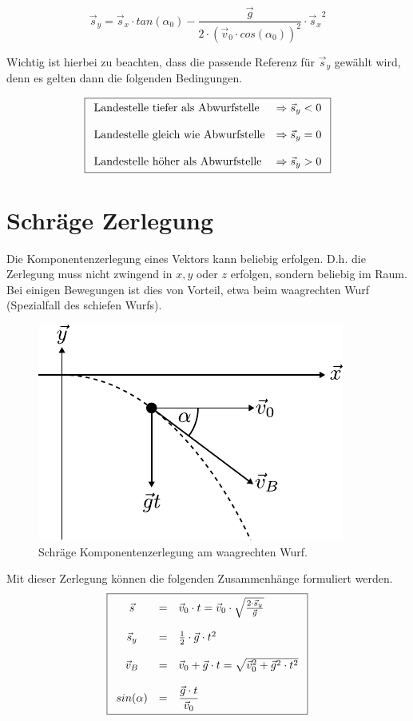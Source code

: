 \[ \boxed{
	\vec{s}_y = \vec{s}_x \cdot tan(\alpha_0) 
		- \frac{\vec{g}}{2 \cdot \left(
		\vec{v}_0 \cdot cos(\alpha_0) \right)^2}
		\cdot {\vec{s}_x}^2
} \]

\noindent
Wichtig ist hierbei zu beachten, dass die passende Referenz für 
$\vec{s}_y$ gewählt wird, denn es gelten dann die folgenden Bedingungen.

\[ \boxed{\begin{array}{l l}
	\text{Landestelle tiefer als Abwurfstelle} 
		& \Rightarrow \vec{s}_y < 0 \\
	& \\
	\text{Landestelle gleich wie Abwurfstelle} 
		& \Rightarrow \vec{s}_y = 0 \\
	& \\
	\text{Landestelle höher als Abwurfstelle} 
		& \Rightarrow \vec{s}_y > 0 
\end{array}} \]


\section{Schräge Zerlegung}
Die Komponentenzerlegung eines Vektors kann beliebig erfolgen. 
D.h. die Zerlegung muss nicht zwingend in $x,y$ oder $z$ erfolgen,
sondern beliebig im Raum. Bei einigen Bewegungen ist dies von Vorteil,
etwa beim waagrechten Wurf (Spezialfall des schiefen Wurfs).

\begin{figure}[h!]
	\centering
	\includegraphics[scale=0.8]{../fig/wurf2.pdf}
	\caption{Schräge Komponentenzerlegung am waagrechten Wurf.}
	\label{fig:wurf2}
\end{figure}

\noindent
Mit dieser Zerlegung können die folgenden Zusammenhänge formuliert werden.
\[ \boxed{\begin{array}{c c l}
	\vec{s} 
		&=& \vec{v}_0 \cdot t
		= \vec{v}_0\cdot\sqrt{\frac{2\cdot\vec{s}_y}{\vec{g}}} \\
	& & \\
	\vec{s}_y 
		&=& \frac{1}{2} \cdot \vec{g} \cdot t^2 \\
	& & \\
	\vec{v}_B 
		&=& \vec{v}_0 + \vec{g} \cdot t
		= \sqrt{{\vec{v}_0}^2 + {\vec{g}}^2 \cdot t^2} \\
	& & \\
	sin(\alpha)
		&=& \displaystyle \frac{\vec{g}\cdot t}{\vec{v}_0}
\end{array}}\]

